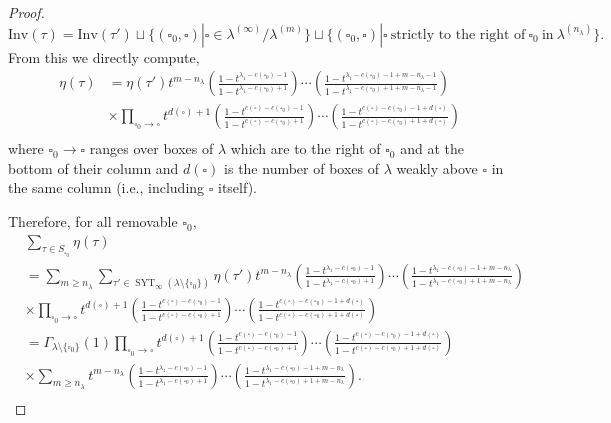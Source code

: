 \documentclass[10pt,a4paper]{amsart}
\DeclareMathOperator{\SYT}{\mathrm{SYT}}
\begin{document}
\begin{proof}
    $$\mathrm{Inv}(\tau) = \mathrm{Inv}(\tau') \sqcup \{ (\square_0,\square)| \square \in \lambda^{(\infty)}/\lambda^{(m)}\} \sqcup \{(\square_0,\square)|\square ~ \text{strictly to the right of} ~ \square_0 ~ \text{in} ~ \lambda^{(n_{\lambda})}\}.$$
    From this we directly compute,
    \begin{align*}
        \eta(\tau) &= \eta(\tau') t^{m-n_{\lambda}} \left(\frac{1-t^{\lambda_1-c(\square_0)-1}}{1-t^{\lambda_1-c(\square_0)+1}}\right)\cdots \left(\frac{1-t^{\lambda_1-c(\square_0)-1+m-n_{\lambda}-1}}{1-t^{\lambda_1-c(\square_0)+1+m-n_{\lambda}-1}}\right) \\
        & \times \prod_{\square_0 \rightarrow \square} t^{d(\square)+1}\left(\frac{1-t^{c(\square)-c(\square_0)-1}}{1-t^{c(\square)-c(\square_0)+1}}\right) \cdots \left(\frac{1-t^{c(\square)-c(\square_0)-1+d(\square)}}{1-t^{c(\square)-c(\square_0)+1+d(\square)}}\right)\\
    \end{align*}
    where $\square_0 \rightarrow \square$ ranges over boxes of $\lambda$ which are to the right of $\square_0$ and at the bottom of their column and $d(\square)$ is the number of boxes of $\lambda$ weakly above $\square$ in the same column (i.e., including $\square$ itself).

    Therefore, for all removable $\square_0,$
    \begin{align*}
        &\sum_{\tau\in S_{\square_0}} \eta(\tau) \\
        &=\sum_{m \geq n_{\lambda}} \sum_{\tau' \in \SYT_{\infty}(\lambda\setminus \{\square_0\})}\eta(\tau') t^{m-n_{\lambda}} \left(\frac{1-t^{\lambda_1-c(\square_0)-1}}{1-t^{\lambda_1-c(\square_0)+1}}\right)\cdots \left(\frac{1-t^{\lambda_1-c(\square_0)-1+m-n_{\lambda}}}{1-t^{\lambda_1-c(\square_0)+1+m-n_{\lambda}}}\right) \\
        & \times \prod_{\square_0 \rightarrow \square} t^{d(\square)+1}\left(\frac{1-t^{c(\square)-c(\square_0)-1}}{1-t^{c(\square)-c(\square_0)+1}}\right) \cdots \left(\frac{1-t^{c(\square)-c(\square_0)-1+d(\square)}}{1-t^{c(\square)-c(\square_0)+1+d(\square)}}\right)\\
        &= \Gamma_{\lambda \setminus \{\square_0\}}(1)\prod_{\square_0 \rightarrow \square} t^{d(\square)+1}\left(\frac{1-t^{c(\square)-c(\square_0)-1}}{1-t^{c(\square)-c(\square_0)+1}}\right) \cdots \left(\frac{1-t^{c(\square)-c(\square_0)-1+d(\square)}}{1-t^{c(\square)-c(\square_0)+1+d(\square)}}\right) \\
        & \times \sum_{m \geq n_{\lambda}} t^{m-n_{\lambda}} \left(\frac{1-t^{\lambda_1-c(\square_0)-1}}{1-t^{\lambda_1-c(\square_0)+1}}\right)\cdots \left(\frac{1-t^{\lambda_1-c(\square_0)-1+m-n_{\lambda}}}{1-t^{\lambda_1-c(\square_0)+1+m-n_{\lambda}}}\right).\\
    \end{align*}


\end{proof}
\end{document}
